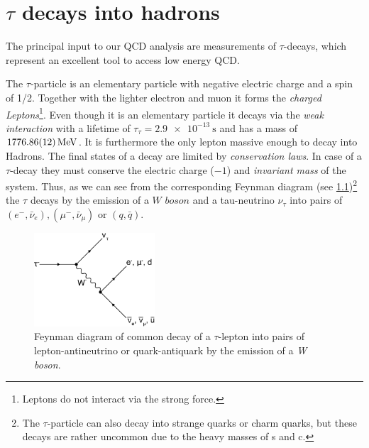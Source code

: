 \documentclass[../../index.tex]{subfiles}
\begin{document}
\chapter{$\tau$ decays into hadrons}
The principal input to our QCD analysis are measurements of $\tau$-decays, which
represent an excellent tool to access low energy QCD.

The $\tau$-particle is an elementary particle with negative electric charge and a
spin of 1/2. Together with the lighter electron and muon it forms the
\textit{charged Leptons}\footnote{Leptons do not interact via the strong force.}.
Even though it is an elementary particle it decays via the \textit{weak
  interaction} with a lifetime of $\tau_\tau=\SI{2.9e-13}{\second}$ and has a mass
of $\SI{1776.86\pm0.12}{\mega\electronvolt}$\cite{PDG2018}. It is furthermore the only
lepton massive enough to decay into Hadrons.
The final states of a decay are limited by \textit{conservation laws}. In case
of a $\tau$-decay they must conserve the electric charge ($-1$) and
\textit{invariant mass} of the system. Thus, as we can see from
the corresponding Feynman diagram
(see \cref{fig:tauDecay})\footnote{The $\tau$-particle can also decay into strange
  quarks or charm quarks, but these decays are rather uncommon due to the heavy
  masses of s and c.} the $\tau$ decays by the emission of a $\textit{W boson}$
and a tau-neutrino $\nu_\tau$ into pairs of $(e^-, \bar\nu_e), (\mu^-,
\bar\nu_\mu)$ or $(q, \bar q)$.
\begin{figure}[h]
  \centering
  \includegraphics[width=0.4\textwidth]{images/tauDecay.eps}
  \caption{Feynman diagram of common decay of a $\tau$-lepton into pairs of
    lepton-antineutrino or quark-antiquark by the emission of a \textit{W boson}.}
  \label{fig:tauDecay}
\end{figure}
\end{document}
